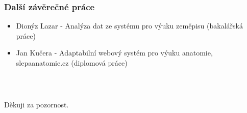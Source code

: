 \documentclass[xcolor=svgnames]{beamer}
\begin{document}
\begin{frame}
	\frametitle{Další závěrečné práce}
  \begin{itemize}
  \item Dionýz Lazar - Analýza dat ze systému pro výuku zeměpisu (bakalářská práce)
  \item Jan Kučera - Adaptabilní webový systém pro výuku anatomie, slepaanatomie.cz (diplomová práce)
  \end{itemize}
\end{frame}
\begin{frame}
  \frametitle{~}
\begin{center} 
\huge  Děkuji za pozornost.
\end{center}
\end{frame}
\end{document}
